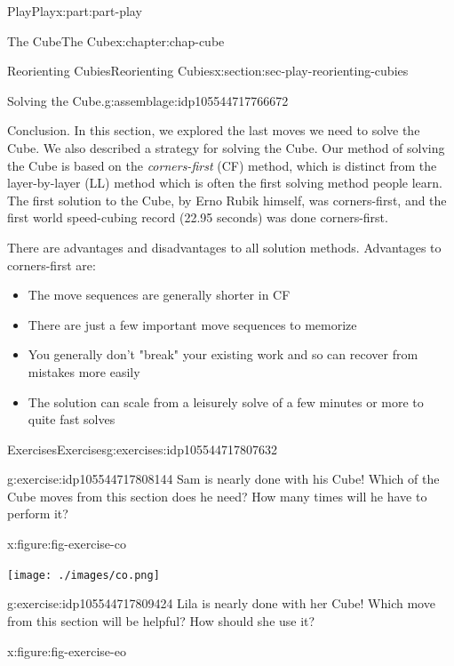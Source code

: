\documentclass[oneside,10pt,]{book}
\numberwithin{equation}{section}
\begin{document}
\begin{partptx}{Play}{}{Play}{}{}{x:part:part-play}
\begin{chapterptx}{The Cube}{}{The Cube}{}{}{x:chapter:chap-cube}
\begin{sectionptx}{Reorienting Cubies}{}{Reorienting Cubies}{}{}{x:section:sec-play-reorienting-cubies}
\begin{assemblage}{Solving the Cube.}{g:assemblage:idp105544717766672}
\begin{enumerate}
\end{enumerate}
%
\end{assemblage}
\begin{conclusion}{Conclusion.}%
In this section, we explored the last moves we need to solve the Cube. We also described a strategy for solving the Cube. Our method of solving the Cube is based on the \emph{corners-first} (CF) method, which is distinct from the layer-by-layer (LL) method which is often the first solving method people learn. The first solution to the Cube, by Erno Rubik himself, was corners-first, and the first world speed-cubing record (22.95 seconds) was done corners-first.%
\par
There are advantages and disadvantages to all solution methods. Advantages to corners-first are:%
\begin{itemize}[label=\textbullet]
\item{}The move sequences are generally shorter in CF%
\item{}There are just a few important move sequences to memorize%
\item{}You generally don't "break" your existing work and so can recover from mistakes more easily%
\item{}The solution can scale from a leisurely solve of a few minutes or more to quite fast solves%
\end{itemize}
%
\end{conclusion}%
%
%
\typeout{************************************************}
\typeout{************************************************}
%
\begin{exercises-subsection-numberless}{Exercises}{}{Exercises}{}{}{g:exercises:idp105544717807632}
\begin{divisionexercise}{1}{}{}{g:exercise:idp105544717808144}%
Sam is nearly done with his Cube! Which of the Cube moves from this section does he need? How many times will he have to perform it?%
\begin{figureptx}{}{x:figure:fig-exercise-co}{}%
\begin{image}{0.25}{0.5}{0.25}%
\texttt{[image: ./images/co.png]}
\end{image}%
\tcblower
\end{figureptx}%
\end{divisionexercise}%
\begin{divisionexercise}{2}{}{}{g:exercise:idp105544717809424}%
Lila is nearly done with her Cube! Which move from this section will be helpful? How should she use it?%
\begin{figureptx}{}{x:figure:fig-exercise-eo}{}%

\end{figureptx}
\end{divisionexercise}
\end{exercises-subsection-numberless}
\end{sectionptx}
\end{chapterptx}
\end{partptx}
\end{document}
